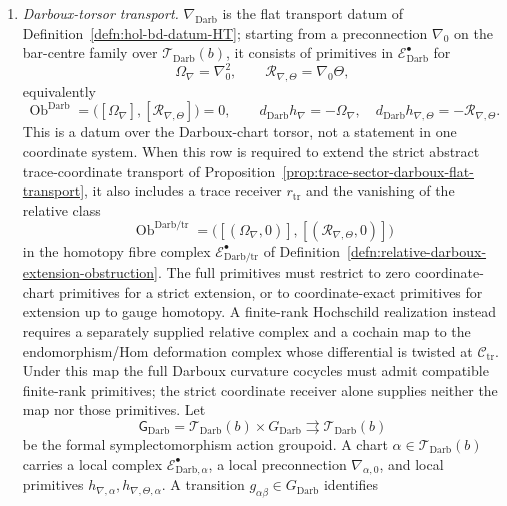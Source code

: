 \begin{defn}
\begin{enumerate}[label=\textup{(D\arabic*)}]
  \item \emph{Darboux-torsor transport.}
    \(\nabla_{\mathrm{Darb}}\) is the flat transport datum of
    Definition~\ref{defn:hol-bd-datum-HT}; starting from a preconnection
    \(\nabla_0\) on the bar-centre family over
    \(\mathcal T_{\mathrm{Darb}}(b)\), it consists of primitives in
    \(\mathcal E^\bullet_{\mathrm{Darb}}\) for
    \[
      \Omega_{\nabla}=\nabla_0^2,\qquad
      \mathcal R_{\nabla,\Theta}=\nabla_0\Theta ,
    \]
    equivalently
    \[
      \operatorname{Ob}^{\mathrm{Darb}}
      =
      \bigl([\Omega_{\nabla}],
      [\mathcal R_{\nabla,\Theta}]\bigr)=0,
      \qquad
      d_{\mathrm{Darb}}h_{\nabla}=-\Omega_{\nabla},\quad
      d_{\mathrm{Darb}}h_{\nabla,\Theta}
      =-\mathcal R_{\nabla,\Theta}.
    \]
    This is a datum over the Darboux-chart torsor, not a statement in
    one coordinate system.  When this row is required to extend the
    strict abstract trace-coordinate transport of
    Proposition~\ref{prop:trace-sector-darboux-flat-transport}, it also
    includes a trace receiver \(r_{\mathrm{tr}}\) and the vanishing of the
    relative class
    \[
      \operatorname{Ob}^{\mathrm{Darb}/\mathrm{tr}}
      =
      \bigl([(\Omega_\nabla,0)],
            [(\mathcal R_{\nabla,\Theta},0)]\bigr)
    \]
    in the homotopy fibre complex
    \(\mathcal E^\bullet_{\mathrm{Darb}/\mathrm{tr}}\) of
    Definition~\ref{defn:relative-darboux-extension-obstruction}.  The
    full primitives must restrict to zero coordinate-chart primitives
    for a strict extension, or to coordinate-exact primitives for
    extension up to gauge homotopy.  A finite-rank Hochschild
    realization instead requires a separately supplied relative
    complex and a cochain map to the endomorphism/Hom deformation
    complex whose differential is twisted at
    \(\mathcal C_{\mathrm{tr}}\).  Under this map the full Darboux
    curvature cocycles must admit compatible finite-rank primitives;
    the strict coordinate receiver alone supplies neither the map nor
    those primitives.  Let
    \[
      \mathsf G_{\mathrm{Darb}}
      =
      \mathcal T_{\mathrm{Darb}}(b)\times
      G_{\mathrm{Darb}}
      \rightrightarrows
      \mathcal T_{\mathrm{Darb}}(b)
    \]
    be the formal symplectomorphism action groupoid.  A chart
    \(\alpha\in\mathcal T_{\mathrm{Darb}}(b)\) carries a local complex
    \(\mathcal E^\bullet_{\mathrm{Darb},\alpha}\), a local
    preconnection \(\nabla_{\alpha,0}\), and local primitives
    \(h_{\nabla,\alpha},h_{\nabla,\Theta,\alpha}\).  A transition
    \(g_{\alpha\beta}\in G_{\mathrm{Darb}}\) identifies

\end{enumerate}
\end{defn}
